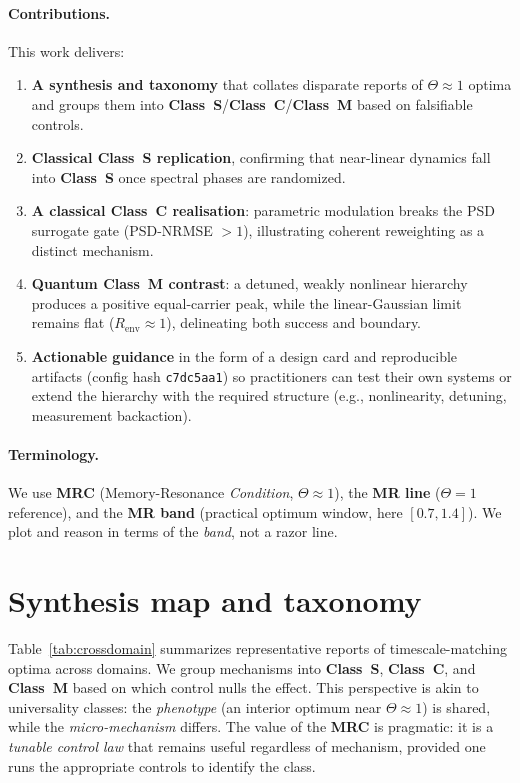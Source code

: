 \documentclass[11pt,letterpaper]{article}
\newcommand{\confighash}{c7dc5aa1}
\DeclareRobustCommand{\mrc}{\textbf{MRC}\xspace}
\DeclareRobustCommand{\classS}{\textbf{Class~S}\xspace}
\DeclareRobustCommand{\classC}{\textbf{Class~C}\xspace}
\DeclareRobustCommand{\classM}{\textbf{Class~M}\xspace}
\begin{document}
\paragraph*{Contributions.}
This work delivers:
\begin{enumerate}[leftmargin=*]
  \item \textbf{A synthesis and taxonomy} that collates disparate reports of $\Theta\!\approx\!1$ optima and groups them into \classS/\classC/\classM{} based on falsifiable controls.
  \item \textbf{Classical Class~S replication}, confirming that near-linear dynamics fall into \classS{} once spectral phases are randomized.
  \item \textbf{A classical Class~C realisation}: parametric modulation breaks the PSD surrogate gate (PSD-NRMSE $>1$), illustrating coherent reweighting as a distinct mechanism.
  \item \textbf{Quantum \classM{} contrast}: a detuned, weakly nonlinear hierarchy produces a positive equal-carrier peak, while the linear-Gaussian limit remains flat ($R_{\mathrm{env}}\approx 1$), delineating both success and boundary.
  \item \textbf{Actionable guidance} in the form of a design card and reproducible artifacts (config hash \texttt{\confighash}) so practitioners can test their own systems or extend the hierarchy with the required structure (e.g., nonlinearity, detuning, measurement backaction).
\end{enumerate}

\paragraph*{Terminology.} We use \textbf{MRC} (Memory-Resonance \emph{Condition}, $\Theta\!\approx\!1$), the \textbf{MR line} ($\Theta=1$ reference), and the \textbf{MR band} (practical optimum window, here $[0.7,1.4]$). We plot and reason in terms of the \emph{band}, not a razor line.

\section{Synthesis map and taxonomy}
Table~\ref{tab:crossdomain} summarizes representative reports of timescale-matching optima across domains. We group mechanisms into \classS{}, \classC{}, and \classM{} based on which control nulls the effect. This perspective is akin to universality classes: the \emph{phenotype} (an interior optimum near $\Theta\!\approx\!1$) is shared, while the \emph{micro-mechanism} differs. The value of the \mrc is pragmatic: it is a \emph{tunable control law} that remains useful regardless of mechanism, provided one runs the appropriate controls to identify the class.
\end{document}
